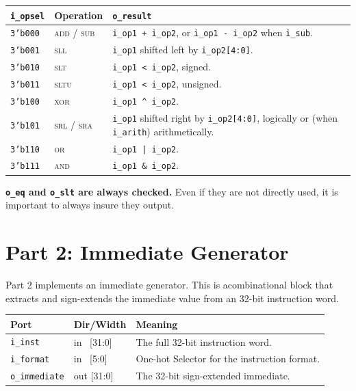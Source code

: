 \documentclass[11pt]{article}
\begin{document}
\begin{center}
\begin{tabular}{@{}llp{7.8cm}@{}}
\toprule
\textbf{\texttt{i\_opsel}} & \textbf{Operation} & \textbf{\texttt{o\_result}} \\
\midrule
\texttt{3'b000} & \textsc{add} / \textsc{sub} & \texttt{i\_op1 + i\_op2}, or \texttt{i\_op1 - i\_op2} when \texttt{i\_sub}. \\
\texttt{3'b001} & \textsc{sll}                & \texttt{i\_op1} shifted left by \texttt{i\_op2[4:0]}. \\
\texttt{3'b010} & \textsc{slt} & \texttt{i\_op1 < i\_op2}, signed. \\
\texttt{3'b011} & \textsc{sltu} & \texttt{i\_op1 < i\_op2}, unsigned. \\
\texttt{3'b100} & \textsc{xor}                & \texttt{i\_op1 \^{} i\_op2}. \\
\texttt{3'b101} & \textsc{srl} / \textsc{sra} & \texttt{i\_op1} shifted right by \texttt{i\_op2[4:0]}, logically or (when \texttt{i\_arith}) arithmetically. \\
\texttt{3'b110} & \textsc{or}                 & \texttt{i\_op1 | i\_op2}. \\
\texttt{3'b111} & \textsc{and}                & \texttt{i\_op1 \& i\_op2}. \\
\bottomrule
\end{tabular}
\end{center}

\begin{clarification}
\textbf{\texttt{o\_eq} and \texttt{o\_slt} are always checked.} Even if they are not directly used, it is important to always insure they output.
\end{clarification}

\newpage

\section{Part 2: Immediate Generator}
\label{sec:imm}
Part 2 implements an immediate generator. This is acombinational block that extracts and sign-extends the immediate value from an 32-bit instruction word.

\begin{center}
\begin{tabular}{@{}llp{8.6cm}@{}}
\toprule
\textbf{Port} & \textbf{Dir/Width} & \textbf{Meaning} \\
\midrule
\texttt{i\_inst}      & in \ [31:0] & The full 32-bit instruction word. \\
\texttt{i\_format}    & in \ [5:0]  & One-hot Selector for the instruction format. \\
\texttt{o\_immediate} & out [31:0]  & The 32-bit sign-extended immediate. \\
\bottomrule
\end{tabular}
\end{center}
\end{document}
